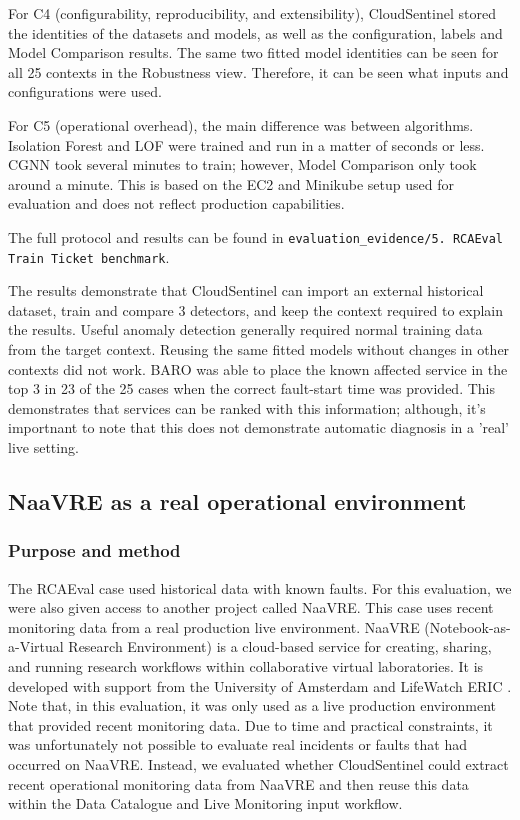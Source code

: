 For C4 (configurability, reproducibility, and extensibility), CloudSentinel stored the identities of the datasets and models, as well as the configuration, labels and Model Comparison results. The same two fitted model identities can be seen for all 25 contexts in the Robustness view. Therefore, it can be seen what inputs and configurations were used.

For C5 (operational overhead), the main difference was between algorithms. Isolation Forest and LOF were trained and run in a matter of seconds or less. CGNN took several minutes to train; however, Model Comparison only took around a minute. This is based on the EC2 and Minikube setup used for evaluation and does not reflect production capabilities.

The full protocol and results can be found in \texttt{evaluation\_evidence/5. RCAEval Train Ticket benchmark}.

The results demonstrate that CloudSentinel can import an external historical dataset, train and compare 3 detectors, and keep the context required to explain the results. Useful anomaly detection generally required normal training data from the target context. Reusing the same fitted models without changes in other contexts did not work. BARO was able to place the known affected service in the top 3 in 23 of the 25 cases when the correct fault-start time was provided. This demonstrates that services can be ranked with this information; although, it's importnant to note that this does not demonstrate automatic diagnosis in a 'real' live setting.

\subsection{NaaVRE as a real operational environment}

\subsubsection{Purpose and method}

The RCAEval case used historical data with known faults. For this evaluation, we were also given access to another project called NaaVRE. This case uses recent monitoring data from a real production live environment. NaaVRE (Notebook-as-a-Virtual Research Environment) is a cloud-based service for creating, sharing, and running research workflows within collaborative virtual laboratories. It is developed with support from the University of Amsterdam and LifeWatch ERIC \textcite{zhao2022naavre}. Note that, in this evaluation, it was only used as a live production environment that provided recent monitoring data. Due to time and practical constraints, it was unfortunately not possible to evaluate real incidents or faults that had occurred on NaaVRE. Instead, we evaluated whether CloudSentinel could extract recent operational monitoring data from NaaVRE and then reuse this data within the Data Catalogue and Live Monitoring input workflow.

